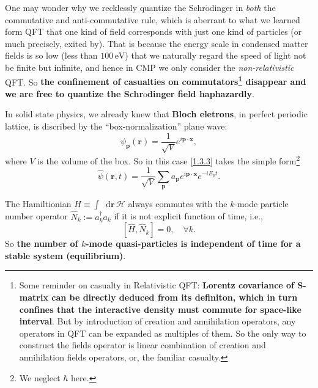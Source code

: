 \documentclass[b5paper,10pt,UTF8]{book}
\newcommand*\dd{\mathop{}\!\mathrm{d}}
\numberwithin{equation}{section}
\begin{document}
		\begin{Note}
			One may wonder why we recklessly quantize the Schr$\ddot{\text{o}}$dinger in \emph{both} the commutative and anti-commutative rule, which is aberrant to what we learned form QFT that one kind of field corresponds with just one kind of particles (or much precisely, exited by). That is because the energy scale in condensed matter fields is so low (less than $100\,\mathrm{eV}$) that we naturally regard the speed of light not be finite but infinite, and hence in CMP we only consider the \emph{non-relativistic} QFT. So \textbf{the confinement of casualties on commutators\footnote{Some reminder on casualty in Relativistic QFT: \textbf{Lorentz covariance of S-matrix can be directly deduced from its definiton, which in turn confines that the interactive density must commute for space-like interval}. But by introduction of creation and annihilation operators, any operators in QFT can be expanded as multiples of them. So the only way to construct the fields operator is linear combination of creation and annihilation fields operators, or, the familiar casualty.} disappear and we are free to quantize the Schr$\ddot{\text{o}}$dinger field haphazardly}.
		\end{Note}
		\begin{Example}
			\par
			In solid state physics, we already knew that \textbf{Bloch eletrons}, in perfect periodic lattice, is discribed by the ``box-normalization'' plane wave:
			$$\psi_{\bm{p}}(\bm{r})=\dfrac{1}{\sqrt{V}}e^{i\bm{p\cdot x}},$$
			where $V$ is the volume of the box. So in this case \eqref{1.3.3} takes the simple form\footnote{We neglect $\hbar$ here.}
			\begin{equation}\label{1.3.5}
				\hat{\psi}(\bm{r},t)=\dfrac{1}{\sqrt{V}}\sum_{\bm{p}}a_{\bm{p}}e^{i\bm{p\cdot x}}e^{-iE_p t}.
			\end{equation}
		\end{Example}
		\begin{Proposition}
			The Hamiltionian $\hat{H}\equiv\int\dd\bm{r}\,\mathcal{H}$ always commutes with the $k$-mode particle number operator $\hat{N}_k:=a_k^\dagger a_k$ if it is not explicit function of time, i.e.,
			\begin{equation}\label{1.3.6}
				[\hat{H},\hat{N}_{k}]=0,\quad\forall k.
			\end{equation}
			So \textbf{the number of $k$-mode quasi-particles is independent of time for a stable system (equilibrium)}.
		\end{Proposition}
\end{document}
